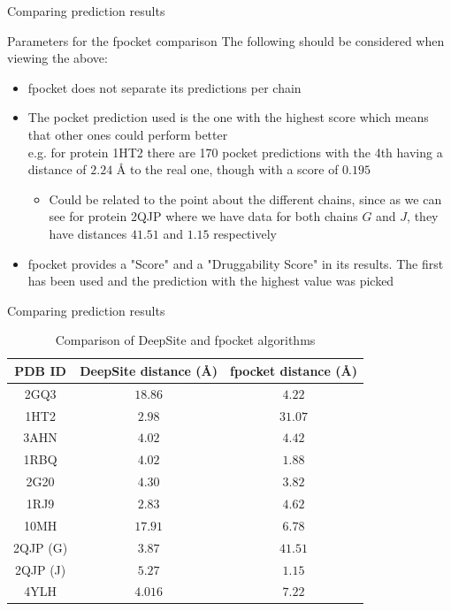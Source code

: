 \documentclass{beamer}
\begin{document}
\begin{frame}{Comparing prediction results}
  \begin{block}{Parameters for the fpocket comparison}
    The following should be considered when viewing the above:
    \begin{itemize}
      \item fpocket does not separate its predictions per chain
      \item The pocket prediction used is the one with the highest score which means that other ones could perform better \\
      e.g. for protein 1HT2 there are 170 pocket predictions with the 4th having a distance of $2.24$ \AA\; to the real one, though with a score of $0.195$
      \begin{itemize}
        \item Could be related to the point about the different chains, since as we can see for protein 2QJP where we have data for both chains $G$ and $J$, they have distances $41.51$ and $1.15$ respectively
      \end{itemize}
      \item fpocket provides a "Score" and a "Druggability Score" in its results. The first has been used and the prediction with the highest value was picked
    \end{itemize}
  \end{block}
\end{frame}

\begin{frame}{Comparing prediction results}
  \begin{tiny}
  \begin{table}
  \caption{Comparison of DeepSite and fpocket algorithms}
  \label{table:6}
  \begin{tabular}{ c | c | c }
    PDB ID & DeepSite distance (\AA) & fpocket distance (\AA) \\
    \hline
    2GQ3 & $18.86$ & $4.22$ \\
    1HT2 & $2.98$ & $31.07$ \\
    3AHN & $4.02$ & $4.42$ \\
    1RBQ & $4.02$ & $1.88$ \\
    2G20 & $4.30$ & $3.82$ \\
    1RJ9 & $2.83$ & $4.62$ \\
    10MH & $17.91$ & $6.78$ \\
    2QJP (G) & $3.87$ & $41.51$ \\
    2QJP (J) & $5.27$ & $1.15$ \\
    4YLH & $4.016$ & $7.22$
  \end{tabular}
  \end{table}
  \end{tiny}
\end{frame}
\end{document}

